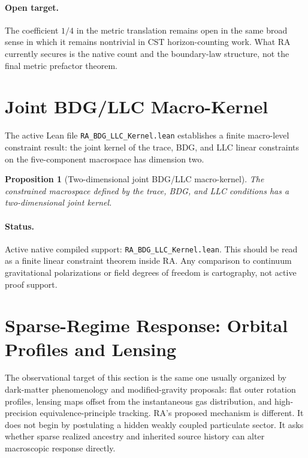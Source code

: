 \documentclass[11pt]{article}
\newtheorem{proposition}{Proposition}
\begin{document}
\paragraph{Open target.} The coefficient $1/4$ in the metric translation remains open in the same broad sense in which it remains nontrivial in CST horizon-counting work. What RA currently secures is the native count and the boundary-law structure, not the final metric prefactor theorem.

\section{Joint BDG/LLC Macro-Kernel}
\label{sec:macro_kernel}

The active Lean file \texttt{RA\_BDG\_LLC\_Kernel.lean} establishes a finite macro-level constraint result: the joint kernel of the trace, BDG, and LLC linear constraints on the five-component macrospace has dimension two.
\begin{proposition}[Two-dimensional joint BDG/LLC macro-kernel]
The constrained macrospace defined by the trace, BDG, and LLC conditions has a two-dimensional joint kernel.
\end{proposition}

\paragraph{Status.} Active native compiled support: \texttt{RA\_BDG\_LLC\_Kernel.lean}. This should be read as a finite linear constraint theorem inside RA. Any comparison to continuum gravitational polarizations or field degrees of freedom is cartography, not active proof support.

\section{Sparse-Regime Response: Orbital Profiles and Lensing}
\label{sec:sparse}

The observational target of this section is the same one usually organized by dark-matter phenomenology and modified-gravity proposals: flat outer rotation profiles, lensing maps offset from the instantaneous gas distribution, and high-precision equivalence-principle tracking. RA's proposed mechanism is different. It does not begin by postulating a hidden weakly coupled particulate sector. It asks whether sparse realized ancestry and inherited source history can alter macroscopic response directly.
\end{document}
